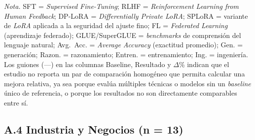 \begin{flushleft}
\scriptsize
\textit{Nota.} SFT = \textit{Supervised Fine-Tuning}; RLHF = \textit{Reinforcement Learning from Human Feedback}; DP-LoRA = \textit{Differentially Private LoRA}; SPLoRA = variante de \textit{LoRA} aplicada a la seguridad del ajuste fino; FL = \textit{Federated Learning} (aprendizaje federado); GLUE/SuperGLUE = \textit{benchmarks} de comprensión del lenguaje natural; Avg.\ Acc. = \textit{Average Accuracy} (exactitud promedio); Gen. = generación; Razon. = razonamiento; Entren. = entrenamiento; Ing. = ingeniería. Los guiones (---) en las columnas Baseline, Resultado y $\Delta$\% indican que el estudio no reporta un par de comparación homogéneo que permita calcular una mejora relativa, ya sea porque evalúa múltiples técnicas o modelos sin un \textit{baseline} único de referencia, o porque los resultados no son directamente comparables entre sí.
\end{flushleft}

\subsection*{A.4 \quad Industria y Negocios \texorpdfstring{(n = 13)}{(n = 13)}}

